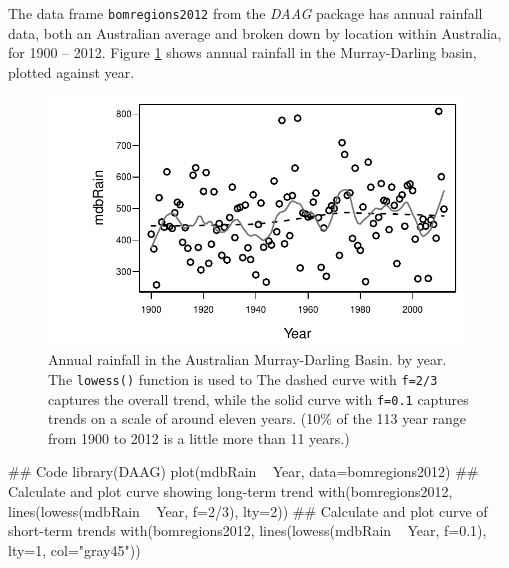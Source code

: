 \documentclass{tufte-book}\usepackage[]{graphicx}\usepackage[]{color}
\newcommand{\txtt}[1]{\texttt{#1}}
\begin{document}
The data frame \txtt{bomregions2012} from the {\em DAAG} package has
annual rainfall data, both an Australian average and broken down by
location within Australia, for 1900 -- 2012.
Figure \ref{fig:mdbRain} shows annual rainfall in the Murray-Darling
basin, plotted against year.

\begin{figure}
\begin{Schunk}


\centerline{\includegraphics[width=0.98\textwidth]{figs/03-MDBrainfall-1} }

\end{Schunk}
\caption{Annual rainfall in the Australian Murray-Darling Basin.
by year.  The \txtt{lowess()} function is used to
The dashed curve with \txtt{f=2/3} captures the
overall trend, while the solid curve with \txtt{f=0.1}
captures trends on a scale of around eleven years. (10\% of the 113 year
range from 1900 to 2012 is a little more than 11 years.)\label{fig:mdbRain}}
\vspace*{-6pt}
\end{figure}

\begin{fullwidth}

\begin{Schunk}
\begin{Sinput}
## Code
library(DAAG)
plot(mdbRain ~ Year, data=bomregions2012)
## Calculate and plot curve showing long-term trend
with(bomregions2012, lines(lowess(mdbRain ~ Year, f=2/3), lty=2))
## Calculate and plot curve of short-term trends
with(bomregions2012, lines(lowess(mdbRain ~ Year, f=0.1),
                           lty=1, col="gray45"))
\end{Sinput}
\end{Schunk}

\end{fullwidth}
\end{document}
